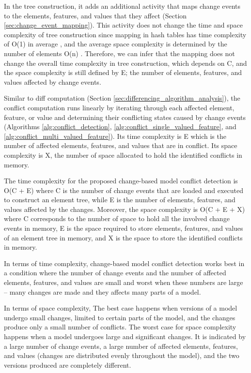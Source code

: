In the tree construction, it adds an additional activity that maps change events to the elements, features, and values that they affect (Section \ref{sec:change_event_mapping}). This activity does not change the time and space complexity of tree construction since mapping in hash tables has time complexity of \textsf{O}(\textsf{1}) in average \cite{cormen2009introduction}, and the average space complexity is determined by the number of elements \textsf{O}(\textsf{n}) \cite{cormen2009introduction}. Therefore, we can infer that the mapping does not change the overall time complexity in tree construction, which depends on \textsf{C}, and the space complexity is still defined by \textsf{E}; the number of elements, features, and values affected by change events.  

Similar to diff computation (Section \ref{sec:differencing_algorithm_analysis}), the conflict computation runs linearly by iterating through each affected element, feature, or value and determining their conflicting states caused by change events (Algorithms \ref{alg:conflict_detection}, \ref{alg:conflict_single_valued_feature}, and \ref{alg:conflict_multi_valued_feature}). Its time complexity is \textsf{E} which is the number of affected elements, features, and values that are in conflict. Its space complexity is \textsf{X}, the number of space allocated to hold the identified conflicts in memory. 

The time complexity for the proposed change-based model conflict detection is \textsf{O}(\textsf{C} + \textsf{E}) where \textsf{C} is the number of change events that are loaded and executed to construct an element tree, while \textsf{E} is the number of elements, features, and values affected by the changes. Moreover, the space complexity is \textsf{O}(\textsf{C} + \textsf{E} + \textsf{X}) where \textsf{C} corresponds to the number of space to hold all the involved change events in memory, \textsf{E} is the space required to store elements, features, and values of an element tree in memory, and \textsf{X} is the space to store the identified conflicts in memory.

In terms of time complexity, change-based model conflict detection works best in a condition where the number of change events and the number of affected elements, features, and values are small and worst when these numbers are large -- many changes are made and they affects many parts of a model. 

In terms of space complexity, The best case happens when versions of a model undergo small changes, limited to certain parts of the model, and the changes produce only a small number of conflicts. The worst case for space complexity happens when a model undergoes large and significant changes. It is indicated by a large number of change events, a large number of affected elements, features, and values (changes are distributed evenly throughout the model), and the two versions produced are completely different.  


